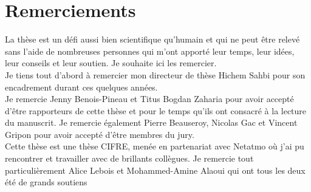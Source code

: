 \chapter*{Remerciements}

\indent La thèse est un défi aussi bien scientifique qu'humain et qui ne peut
être relevé sans l'aide de nombreuses personnes qui m'ont apporté leur temps, leur idées,
leur conseils et leur soutien. Je souhaite ici les remercier.\\

Je tiens tout d'abord à remercier mon directeur de thèse Hichem Sahbi pour son
encadrement durant ces quelques années.\\

Je remercie Jenny Benois-Pineau et Titus Bogdan Zaharia pour avoir accepté
d'être rapporteurs de cette thèse et pour le temps qu'ils ont consacré à la
lecture du manuscrit. Je remercie également Pierre Beauseroy, Nicolas Gac et
Vincent Gripon pour avoir accepté d'être membres du jury.\\

Cette thèse est une thèse CIFRE, menée en partenariat avec Netatmo où j'ai pu
rencontrer et travailler avec de brillants collègues. Je remercie tout
particulièrement Alice Lebois et Mohammed-Amine Alaoui qui ont tous les deux été de grands soutiens 